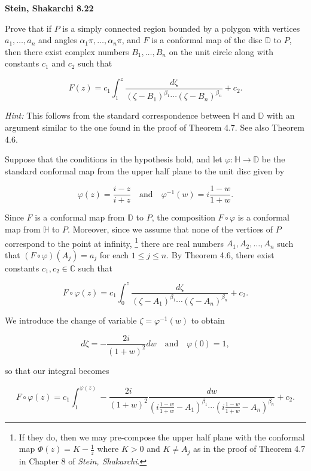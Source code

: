\textbf{Stein, Shakarchi 8.22}

Prove that if $P$ is a simply connected region bounded by a polygon with vertices $a_1, \dots, a_n$ and angles 
$\alpha_1 \pi, \dots, \alpha_n \pi$, and $F$ is a conformal map of the disc $\mathbb{D}$ to $P$, then there exist 
complex numbers $B_1, \dots, B_n$ on the unit circle along with constants $c_1$ and $c_2$ such that

$$
F(z) = c_1 \int_1^z \frac{d\zeta}{(\zeta - B_1)^{\beta_1} \cdots (\zeta - B_n)^{\beta_n}} + c_2.
$$

\textit{Hint: } This follows from the standard correspondence between $\mathbb{H}$ and $\mathbb{D}$ with an argument 
similar to the one found in the proof of Theorem 4.7. See also Theorem 4.6.

\begin{solution}
  Suppose that the conditions in the hypothesis hold, and let $\varphi: \mathbb{H} \to \mathbb{D}$ be the standard 
  conformal map from the upper half plane to the unit disc given by

  $$
  \varphi(z) = \frac{i - z}{i + z} \quad \text{and} \quad \varphi^{-1}(w) = i \frac{1 - w}{1 + w}.
  $$

  Since $F$ is a conformal map from $\mathbb{D}$ to $P$, the composition $F \circ \varphi$ is a conformal map from 
  $\mathbb{H}$ to $P$. Moreover, since we assume that none of the vertices of $P$ correspond to the point at infinity,
  \footnote{
    If they do, then we may pre-compose the upper half plane with the conformal map $\Phi(z) = K - \frac{1}{z}$ where 
    $K > 0$ and $K \neq A_j$ as in the proof of Theorem 4.7 in Chapter 8 of \textit{Stein, Shakarchi}.
  } there are real numbers $A_1, A_2, \dots, A_n$ such that $(F \circ \varphi) (A_j) = a_j$ for each $1 \le j \le n$. By 
  Theorem 4.6, there exist constants $c_1, c_2 \in \mathbb{C}$ such that

  $$
  F \circ \varphi(z) = c_1 \int_0^z \frac{d\zeta}{(\zeta - A_1)^{\beta_1} \cdots (\zeta - A_n)^{\beta_n}} + c_2.
  $$

  We introduce the change of variable $\zeta = \varphi^{-1}(w)$ to obtain

  $$
  d\zeta = -\frac{2i}{(1 + w)^2} dw \quad \text{and} \quad \varphi(0) = 1,
  $$

  so that our integral becomes

  $$
  F \circ \varphi(z) = c_1 \int_1^{\varphi(z)} -\frac{2 i }{(1 + w)^2} \frac{dw}{\left(i \frac{1 - w}{1 + w} - A_1\right)^{\beta_1} \cdots \left(i \frac{1 - w}{1 + w}  - A_n\right)^{\beta_n}} + c_2.
  $$


\end{solution}
